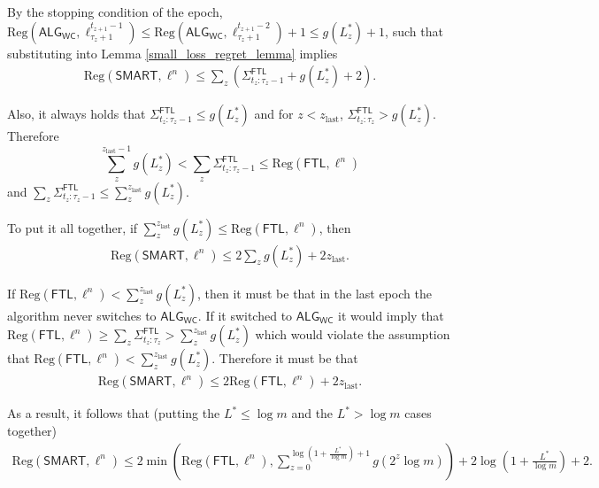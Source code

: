 \documentclass[twoside]{article}
\newcommand{\Reg}{\mathrm{Reg}}
\newcommand{\wcalg}{\mathsf{ALG}_{\mathsf{WC}}}
\newcommand{\zlast}{z_{\mathrm{last}}}
\newcommand{\ftl}{\mathsf{FTL}}
\newcommand{\ftlsum}{\Sigma^{\mathsf{FTL}}}
\newcommand{\bob}{\mathsf{SMART}}
\begin{document}
By the stopping condition of the epoch, $\Reg(\wcalg, \ell_{\tau_z+1}^{t_{z+1}-1}) \leq \Reg(\wcalg, \ell_{\tau_z+1}^{t_{z+1}-2}) + 1 \leq g(L_z^*) + 1$, such that substituting into Lemma \ref{small_loss_regret_lemma} implies
\begin{align}
\Reg(\bob, \ell^n)  \leq \sum_z \left(\ftlsum_{t_z:\tau_z-1} + g(L_z^*) + 2\right).
\end{align}


Also, it always holds that $\ftlsum_{t_z:\tau_z-1} \leq g(L_z^*)$ and for $z < \zlast$, $\ftlsum_{t_z:\tau_z} > g(L_z^*)$. Therefore 
\[\sum_z^{\zlast-1} g(L_z^*) < \sum_z \ftlsum_{t_z:\tau_z-1} \leq \Reg(\ftl, \ell^n)\]
and $\sum_z \ftlsum_{t_z:\tau_z-1} \leq \sum_z^{\zlast} g(L_z^*)$.

To put it all together, if $\sum_z^{\zlast} g(L_z^*) \leq \Reg(\ftl,\ell^n)$, then 
\begin{align}
\Reg(\bob, \ell^n)  \leq 2 \sum_z g(L_z^*) + 2 \zlast.
\end{align}

If $\Reg(\ftl,\ell^n) < \sum_z^{\zlast} g(L_z^*)$, then it must be that in the last epoch the algorithm never switches to $\wcalg$. If it switched to $\wcalg$ it would imply that $\Reg(\ftl,\ell^n) \geq \sum_z \ftlsum_{t_z:\tau_z} > \sum_z^{\zlast} g(L_z^*)$ which would violate the assumption that $\Reg(\ftl,\ell^n) < \sum_z^{\zlast} g(L_z^*)$. Therefore it must be that
\begin{align}
\Reg(\bob, \ell^n)  \leq 2 \Reg(\ftl, \ell^n) + 2 \zlast.
\end{align}

As a result, it follows that (putting the $L^* \le \log m$ and the $L^* > \log m$ cases together) 
\begin{align}
\Reg(\bob, \ell^n)  \leq 2 \min\left(\Reg(\ftl, \ell^n), \sum_{z = 0}^{\log\left(1+\frac{L^*}{\log m}\right)+1} g(2^z \log m)\right) + 2 \log\left(1+\frac{L^*}{\log m}\right)+2.
\end{align}
\end{document}
